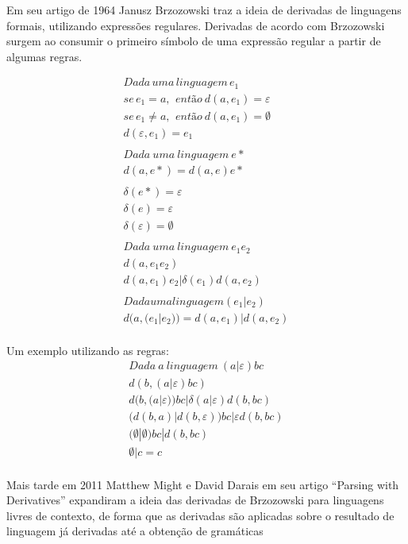 Em seu artigo de 1964 Janusz Brzozowski traz a ideia de derivadas de linguagens formais, utilizando expressões regulares. Derivadas de acordo com Brzozowski surgem ao consumir o primeiro símbolo de uma expressão regular a partir de algumas regras.

\renewcommand{\arraystretch}{0.8}
\[
\begin{array}{c}
Dada\, uma\, linguagem\, e_1\\
se\, e_1 = a,\ \, então\ d(a,e_1) = \varepsilon \\
se\, e_1 \neq a,\ \, então\ d(a,e_1) = \emptyset\\
d(\varepsilon,e_1) = e_1\\
\\
Dada\ uma\ linguagem\ e*\\
d(a,e*) = d(a,e)e*\\
\\
\delta(e*) = \varepsilon\\
\delta(e) = \varepsilon\\
\delta(\varepsilon) = \emptyset\\
\\
Dada\ uma\ linguagem\ e_1e_2\\
d(a,e_1e_2)\\
d(a,e_1)e_2 |  \delta(e_1) d(a,e_2)\\
\\
Dada uma linguagem (e_1|e_2)\\
d(a,(e_1|e_2)) = d(a,e_1) | d(a,e_2)\\

\end{array}
\]

Um exemplo utilizando as regras:
\[\begin{array}{c}
Dada\ a\ linguagem\  (a|\varepsilon)bc\\ 
d(b,(a|\varepsilon)bc)\\ 
d(b,(a|\varepsilon))bc | \delta(a|\varepsilon)d(b,bc)\\
(d(b,a)|d(b,\varepsilon))bc | \varepsilon d(b,bc)\\
(\emptyset|\emptyset)bc | d(b,bc)\\
\emptyset|c = c\\
\end{array}\]

Mais tarde em 2011 Matthew Might e David Darais em seu artigo “Parsing with Derivatives” expandiram a ideia das derivadas de Brzozowski para linguagens livres de contexto, de forma que as derivadas são aplicadas sobre o resultado de linguagem já derivadas até a obtenção de gramáticas 

